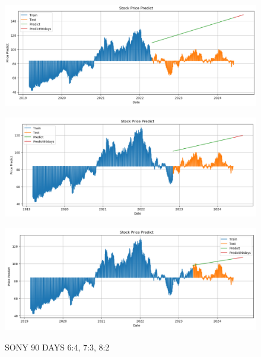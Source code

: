 \documentclass{article}
\begin{document}
\begin{multicols}{2}
\begin{figure}[H]
    \centering
    \begin{minipage}{0.15\textwidth}
    \centering
    \includegraphics[width=1\textwidth]{Image/Linear/Linear_SONY_6_4_90DAYS.png}
   
    \label{fig:1}
    \end{minipage}%
    \begin{minipage}{0.15\textwidth}
    \centering
    \includegraphics[width=1\textwidth]{Image/Linear/Linear_SONY_7_3_90DAYS.png}
  
    \label{fig:2}
    \end{minipage}%
    \begin{minipage}{0.15\textwidth}
    \centering
    \includegraphics[width=1\textwidth]{Image/Linear/Linear_SONY_8_2_90DAYS.png}

    \label{fig:3}
    \end{minipage}
    \caption{SONY 90 DAYS  6:4, 7:3, 8:2 }
\end{figure}



\end{multicols}
\end{document}
